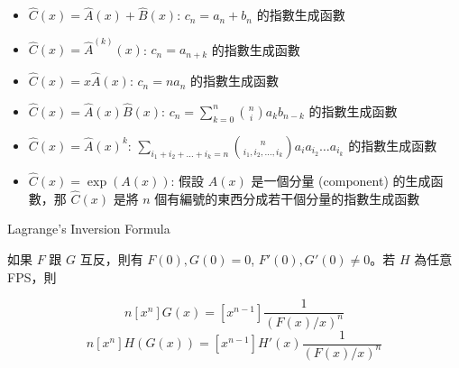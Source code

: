 \begin{itemize}
    \item $\hat C(x) = \hat A(x) + \hat B(x)$: $c_n=a_n+b_n$ 的指數生成函數
    \item $\hat C(x) = \hat A^{(k)}(x)$: $c_n=a_{n+k}$ 的指數生成函數
    \item $\hat C(x) = x\hat A(x)$: $c_n=na_n$ 的指數生成函數
    \item $\hat C(x) = \hat A(x)\hat B(x)$: $c_n=\sum_{k=0}^n \binom{n}{i} a_kb_{n-k}$ 的指數生成函數
    \item $\hat C(x) = \hat A(x)^k$: $\sum\limits_{i_1+i_2+\dots+i_k=n} \binom{n}{i_1,i_2,\dots,i_k}a_ia_{i_2}\dots a_{i_k}$ 的指數生成函數
	\item $\hat C(x) = \exp(A(x))$: 假設 $A(x)$ 是一個分量 (component) 的生成函數，那 $\hat C(x)$ 是將 $n$ 個有編號的東西分成若干個分量的指數生成函數
\end{itemize}

Lagrange's Inversion Formula

如果 $F$ 跟 $G$ 互反，則有 $F(0),G(0) = 0$, $F'(0), G'(0) \neq 0$。若 $H$ 為任意 FPS，則

\[ n [x^n] G(x) = [x^{n-1}]\frac{1}{(F(x)/x)^{n}}\]
\[ n [x^n] H(G(x)) = [x^{n-1}] H'(x) \frac{1}{(F(x)/x)^{n}}\]

